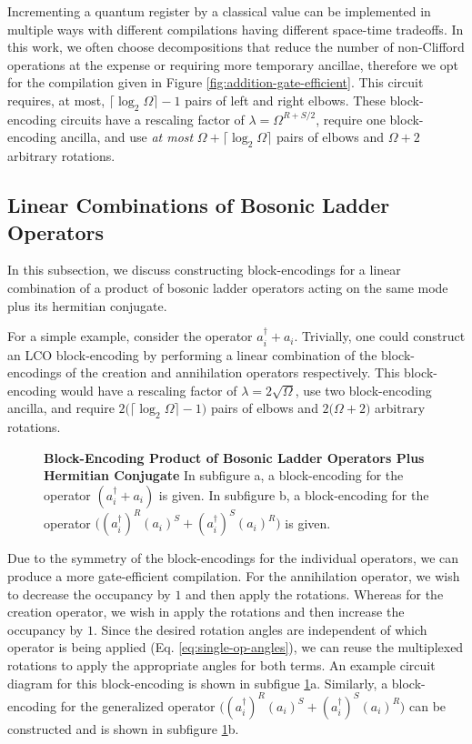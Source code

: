 Incrementing a quantum register by a classical value can be implemented in multiple ways with different compilations having different space-time tradeoffs.
In this work, we often choose decompositions that reduce the number of non-Clifford operations at the expense or requiring more temporary ancillae, therefore we opt for the compilation given in Figure \ref{fig:addition-gate-efficient}.
This circuit requires, at most, $\lceil \log_2 \Omega \rceil - 1$ pairs of left and right elbows.
These block-encoding circuits have a rescaling factor of $\lambda = \Omega^{R+S/2}$, require one block-encoding ancilla, and use \textit{at most} $\Omega + \lceil \log_2 \Omega \rceil$ pairs of elbows and $\Omega + 2$ arbitrary rotations.


\subsection{Linear Combinations of Bosonic Ladder Operators}

In this subsection, we discuss constructing block-encodings for a linear combination of a product of bosonic ladder operators acting on the same mode plus its hermitian conjugate.

For a simple example, consider the operator $a_i^\dagger + a_i$.
Trivially, one could construct an LCO block-encoding by performing a linear combination of the block-encodings of the creation and annihilation operators respectively.
This block-encoding would have a rescaling factor of $\lambda = 2\sqrt{\Omega}$, use two block-encoding ancilla, and require $2\big(\lceil \log_2 \Omega \rceil - 1\big)$ pairs of elbows and $2 \big(\Omega + 2\big)$ arbitrary rotations.


\begin{figure}
    
    
    \caption{
        \textbf{Block-Encoding Product of Bosonic Ladder Operators Plus Hermitian Conjugate}
        In subfigure a, a block-encoding for the operator $(a_i^\dagger + a_i)$ is given.
        In subfigure b, a block-encoding for the operator $\big((a_i^\dagger)^R (a_i)^S + (a_i^\dagger)^S (a_i)^R\big)$ is given.
    }
    \label{fig:lc-bosonic}
\end{figure}


Due to the symmetry of the block-encodings for the individual operators, we can produce a more gate-efficient compilation.
For the annihilation operator, we wish to decrease the occupancy by $1$ and then apply the rotations.
Whereas for the creation operator, we wish in apply the rotations and then increase the occupancy by $1$.
Since the desired rotation angles are independent of which operator is being applied (Eq. \ref{eq:single-op-angles}), we can reuse the multiplexed rotations to apply the appropriate angles for both terms.
An example circuit diagram for this block-encoding is shown in subfigue \ref{fig:lc-bosonic}a.
Similarly, a block-encoding for the generalized operator $\big((a_i^\dagger)^R (a_i)^S + (a_i^\dagger)^S (a_i)^R\big)$ can be constructed and is shown in subfigure \ref{fig:lc-bosonic}b.


